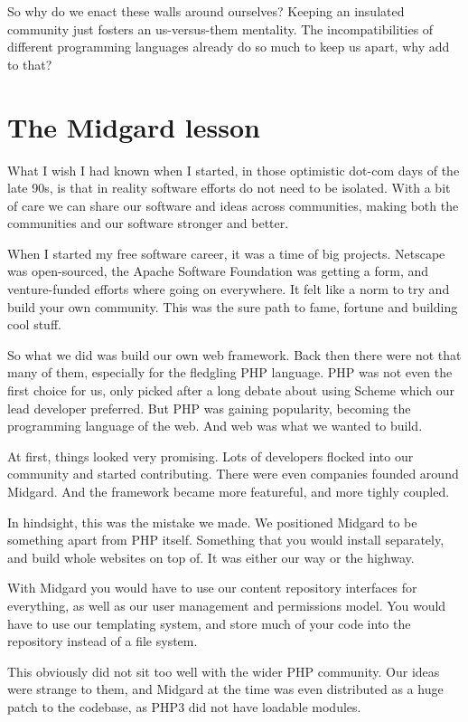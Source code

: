 So why do we enact these walls around ourselves? Keeping an insulated community
just fosters an us-versus-them mentality. The incompatibilities of different
programming languages already do so much to keep us apart, why add to that? 

\section*{The Midgard lesson}

What I wish I had known when I started, in those optimistic dot-com days of the late
90s, is that in reality software efforts do not need to be isolated. With a bit
of care we can share our software and ideas across communities, making both the
communities and our software stronger and better.

When I started my free software career, it was a time of big projects. Netscape
was open-sourced, the Apache Software Foundation was getting a form, and
venture-funded efforts where going on everywhere. It felt like a norm to try and
build your own community. This was the sure path to fame, fortune and building
cool stuff.

So what we did was build our own web framework. Back then there were not that
many of them, especially for the fledgling PHP language. PHP was not even the
first choice for us, only picked after a long debate about using Scheme which
our lead developer preferred. But PHP was gaining popularity, becoming
the programming language of the web. And web was what we wanted to build.

At first, things looked very promising. Lots of developers flocked into our
community and started contributing. There were even companies founded around
Midgard. And the framework became more featureful, and more tighly coupled.

In hindsight, this was the mistake we made. We positioned Midgard to be
something apart from PHP itself. Something that you would install separately,
and build whole websites on top of. It was either our way or the highway.

With Midgard you would have to use our content repository interfaces for
everything, as well as our user management and permissions model. You would have
to use our templating system, and store much of your code into the repository
instead of a file system.

This obviously did not sit too well with the wider PHP community. Our ideas were
strange to them, and Midgard at the time was even distributed as a huge patch to
the codebase, as PHP3 did not have loadable modules.

